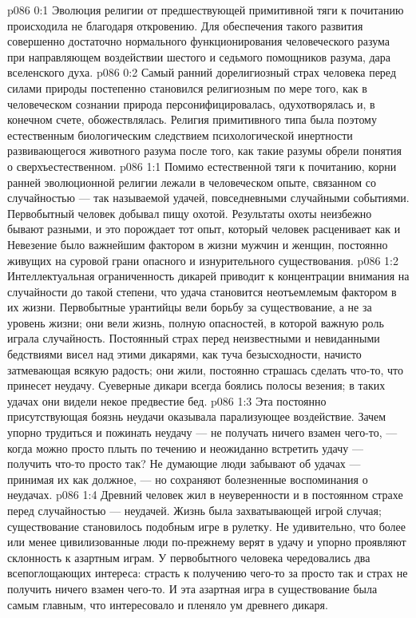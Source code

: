 \vs p086 0:1 Эволюция религии от предшествующей примитивной тяги к почитанию происходила не благодаря откровению. Для обеспечения такого развития совершенно достаточно нормального функционирования человеческого разума при направляющем воздействии шестого и седьмого помощников разума, дара вселенского духа.
\vs p086 0:2 Самый ранний дорелигиозный страх человека перед силами природы постепенно становился религиозным по мере того, как в человеческом сознании природа персонифицировалась, одухотворялась и, в конечном счете, обожествлялась. Религия примитивного типа была поэтому естественным биологическим следствием психологической инертности развивающегося животного разума после того, как такие разумы обрели понятия о сверхъестественном.
\vs p086 1:1 Помимо естественной тяги к почитанию, корни ранней эволюционной религии лежали в человеческом опыте, связанном со случайностью --- так называемой удачей, повседневными случайными событиями. Первобытный человек добывал пищу охотой. Результаты охоты неизбежно бывают разными, и это порождает тот опыт, который человек расценивает как  и  Невезение было важнейшим фактором в жизни мужчин и женщин, постоянно живущих на суровой грани опасного и изнурительного существования.
\vs p086 1:2 Интеллектуальная ограниченность дикарей приводит к концентрации внимания на случайности до такой степени, что удача становится неотъемлемым фактором в их жизни. Первобытные урантийцы вели борьбу за существование, а не за уровень жизни; они вели жизнь, полную опасностей, в которой важную роль играла случайность. Постоянный страх перед неизвестными и невиданными бедствиями висел над этими дикарями, как туча безысходности, начисто затмевающая всякую радость; они жили, постоянно страшась сделать что\hyp{}то, что принесет неудачу. Суеверные дикари всегда боялись полосы везения; в таких удачах они видели некое предвестие бед.
\vs p086 1:3 Эта постоянно присутствующая боязнь неудачи оказывала парализующее воздействие. Зачем упорно трудиться и пожинать неудачу --- не получать ничего взамен чего\hyp{}то, --- когда можно просто плыть по течению и неожиданно встретить удачу --- получить что\hyp{}то просто так? Не думающие люди забывают об удачах --- принимая их как должное, --- но сохраняют болезненные воспоминания о неудачах.
\vs p086 1:4 Древний человек жил в неуверенности и в постоянном страхе перед случайностью --- неудачей. Жизнь была захватывающей игрой случая; существование становилось подобным игре в рулетку. Не удивительно, что более или менее цивилизованные люди по\hyp{}прежнему верят в удачу и упорно проявляют склонность к азартным играм. У первобытного человека чередовались два всепоглощающих интереса: страсть к получению чего\hyp{}то за просто так и страх не получить ничего взамен чего\hyp{}то. И эта азартная игра в существование была самым главным, что интересовало и пленяло ум древнего дикаря.
